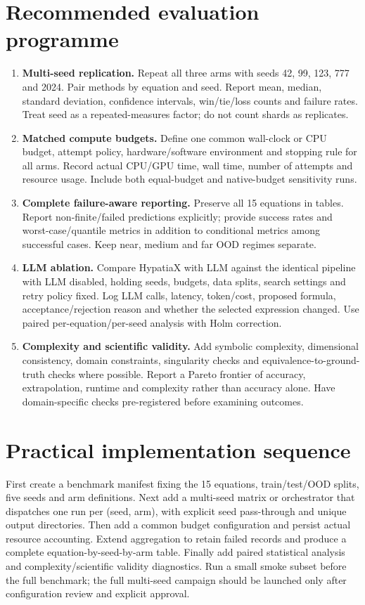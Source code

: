\documentclass[11pt,a4paper]{article}
\begin{document}
\section{Recommended evaluation programme}
\begin{enumerate}[leftmargin=*]
\item \textbf{Multi-seed replication.} Repeat all three arms with seeds
42, 99, 123, 777 and 2024. Pair methods by equation and seed. Report mean,
median, standard deviation, confidence intervals, win/tie/loss counts and
failure rates. Treat seed as a repeated-measures factor; do not count shards
as replicates.
\item \textbf{Matched compute budgets.} Define one common wall-clock or CPU
budget, attempt policy, hardware/software environment and stopping rule for
all arms. Record actual CPU/GPU time, wall time, number of attempts and
resource usage. Include both equal-budget and native-budget sensitivity runs.
\item \textbf{Complete failure-aware reporting.} Preserve all 15 equations
in tables. Report non-finite/failed predictions explicitly; provide success
rates and worst-case/quantile metrics in addition to conditional metrics
among successful cases. Keep near, medium and far OOD regimes separate.
\item \textbf{LLM ablation.} Compare HypatiaX with LLM against the identical
pipeline with LLM disabled, holding seeds, budgets, data splits, search
settings and retry policy fixed. Log LLM calls, latency, token/cost, proposed
formula, acceptance/rejection reason and whether the selected expression
changed. Use paired per-equation/per-seed analysis with Holm correction.
\item \textbf{Complexity and scientific validity.} Add symbolic complexity,
dimensional consistency, domain constraints, singularity checks and
equivalence-to-ground-truth checks where possible. Report a Pareto frontier
of accuracy, extrapolation, runtime and complexity rather than accuracy alone.
Have domain-specific checks pre-registered before examining outcomes.
\end{enumerate}
\section{Practical implementation sequence}
First create a benchmark manifest fixing the 15 equations, train/test/OOD
splits, five seeds and arm definitions. Next add a multi-seed matrix or
orchestrator that dispatches one run per (seed, arm), with explicit seed
pass-through and unique output directories. Then add a common budget
configuration and persist actual resource accounting. Extend aggregation
to retain failed records and produce a complete equation-by-seed-by-arm
table. Finally add paired statistical analysis and complexity/scientific
validity diagnostics. Run a small smoke subset before the full benchmark;
the full multi-seed campaign should be launched only after configuration
review and explicit approval.
\end{document}
